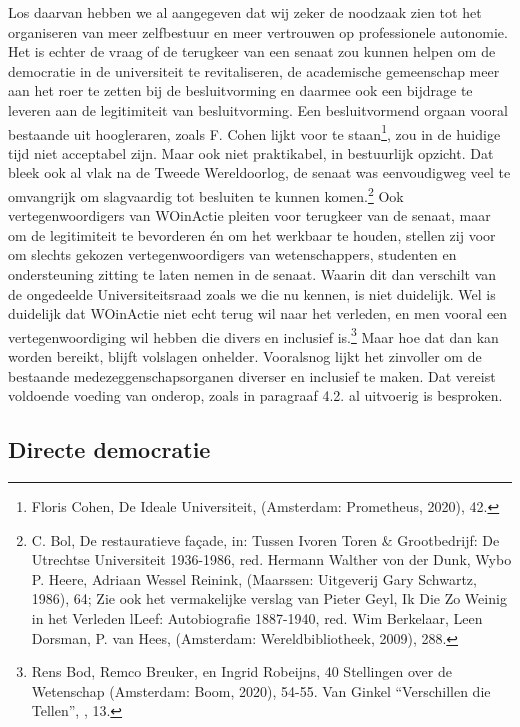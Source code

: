\documentclass{jote-book}
\begin{document}
	Los daarvan hebben we al aangegeven dat wij zeker de noodzaak zien tot het organiseren van meer zelfbestuur en meer vertrouwen op professionele autonomie. Het is echter de vraag of de terugkeer van een senaat zou kunnen helpen om de democratie in de universiteit te revitaliseren, de academische gemeenschap meer aan het roer te zetten bij de besluitvorming en daarmee ook een bijdrage te leveren aan de legitimiteit van besluitvorming. Een besluitvormend orgaan vooral bestaande uit hoogleraren, zoals F. Cohen lijkt voor te staan\footnote{Floris Cohen, De Ideale Universiteit, (Amsterdam: Prometheus, 2020), 42.}, zou in de huidige tijd niet acceptabel zijn. Maar ook niet praktikabel, in bestuurlijk opzicht. Dat bleek ook al vlak na de Tweede Wereldoorlog, de senaat was eenvoudigweg veel te omvangrijk om slagvaardig tot besluiten te kunnen komen.\footnote{C. Bol, De restauratieve façade, in: Tussen Ivoren Toren \& Grootbedrijf: De Utrechtse Universiteit 1936-1986, red. Hermann Walther von der Dunk, Wybo P. Heere, Adriaan Wessel Reinink, (Maarssen: Uitgeverij Gary Schwartz, 1986), 64; Zie ook het vermakelijke verslag van Pieter Geyl, Ik Die Zo Weinig in het Verleden lLeef: Autobiografie 1887-1940, red. Wim Berkelaar, Leen Dorsman, P. van Hees, (Amsterdam: Wereldbibliotheek, 2009), 288.} Ook vertegenwoordigers van WOinActie pleiten voor terugkeer van de senaat, maar om de legitimiteit te bevorderen én om het werkbaar te houden, stellen zij voor om slechts gekozen vertegenwoordigers van wetenschappers, studenten en ondersteuning zitting te laten nemen in de senaat. Waarin dit dan verschilt van de ongedeelde Universiteitsraad zoals we die nu kennen, is niet duidelijk. Wel is duidelijk dat WOinActie niet echt terug wil naar het verleden, en men vooral een vertegenwoordiging wil hebben die divers en inclusief is.\footnote{Rens Bod, Remco Breuker, en Ingrid Robeijns, 40 Stellingen over de Wetenschap (Amsterdam: Boom, 2020), 54-55. Van Ginkel “Verschillen die Tellen”, , 13.} Maar hoe dat dan kan worden bereikt, blijft volslagen onhelder. Vooralsnog lijkt het zinvoller om de bestaande medezeggenschapsorganen diverser en inclusief te maken. Dat vereist voldoende voeding van onderop, zoals in paragraaf 4.2. al uitvoerig is besproken.



	\subsection{Directe democratie}
\end{document}
